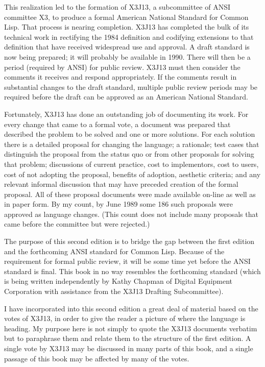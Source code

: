 This realization led to the formation of X3J13, a subcommittee of
ANSI committee X3, to produce a formal American National Standard
for Common Lisp.  That process is nearing completion.  X3J13 has
completed the bulk of its technical work in rectifying the 1984
definition and codifying extensions to that definition that have
received widespread use and approval.  A draft standard is now
being prepared; it will probably be available
in 1990.  There will then be a period (required by ANSI) for
public review.  X3J13 must then consider the comments it receives
and respond appropriately.  If the comments result
in substantial changes to the draft standard, multiple public review
periods may be required before the draft can be approved as an American
National Standard.

Fortunately, X3J13 has done an outstanding job of documenting its work.
For every change that came to a formal vote, a document was prepared
that described the problem to be solved and one or more solutions.
For each solution there is a detailed proposal for changing the
language; a rationale; test cases that distinguish the proposal
from the status quo or from other proposals for solving that problem;
discussions of current practice, cost to implementors, cost to users,
cost of not adopting the proposal, benefits of adoption,
aesthetic criteria; and any relevant informal discussion that may have 
preceded creation of the formal proposal.  All of these proposal
documents were made available on-line as well as in paper form.
By my count, by June 1989 some
186 such proposals were approved as language changes.
(This count does not include many proposals that came before the committee
but were rejected.)

The purpose of this second edition is to bridge the gap between the
first edition and the forthcoming ANSI standard for Common Lisp.
Because of the requirement for formal public review,
it will be some time yet before the ANSI standard is final.
This book in no way resembles the forthcoming standard (which
is being written independently
by Kathy Chapman of Digital Equipment Corporation with assistance
from the X3J13 Drafting Subcommittee).

I have incorporated into this second edition
a great deal of material based on the votes of X3J13,
in order to give the reader a picture of where the language is heading.
My purpose here is not simply to quote the X3J13 documents verbatim
but to paraphrase them and relate them to the structure of the first
edition.  A single vote by X3J13 may be discussed in many parts of this book,
and a single passage of this book may be affected by many of the votes.

